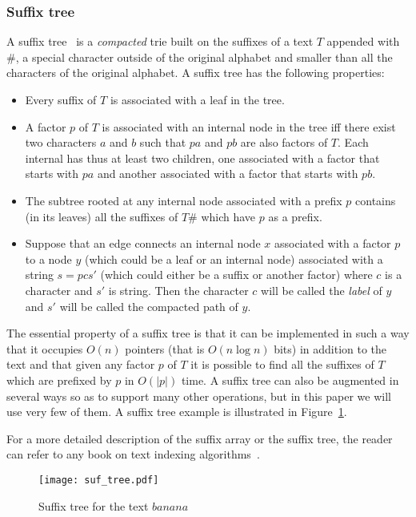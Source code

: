 \documentclass{article}
\newcommand{\?}{\mskip1.5mu}
\begin{document}
\subsubsection{Suffix tree}
A suffix tree~\cite{Wr73,Mc76} is a \emph{compacted} trie built on the suffixes of a text $T$ appended with $\#$, a special character outside of the original alphabet and smaller than all the characters of the original alphabet. 
A suffix tree has the following properties:
\begin{itemize}
\item Every suffix of $T$ is associated with a leaf in the tree.
\item A factor $p$ of $T$ is associated with an internal node in the tree iff there exist two characters $a$ and $b$ such that $pa$ and $pb$ are also factors of $T$. Each internal has thus at least two children, one associated with a factor that starts with $pa$ and another associated with a factor that starts with $pb$. 
\item The subtree rooted at any internal node associated with a prefix $p$ contains (in its leaves) all the suffixes of $T\#$ which have $p$ as a prefix. 
\item Suppose that an edge connects an internal node $x$ associated with a factor $p$ to a node $y$ (which could be a leaf or an internal node) associated with a string $s=pcs'$ (which could either be a suffix or another factor) where $c$ is a character and $s'$ is string. Then the character $c$ will be called the \emph{label} of $y$ and $s'$ will be called the compacted path of $y$. 
\end{itemize}
 The essential property of a suffix tree is that it can be implemented in such a way
that it occupies $O(n)$ pointers (that is $O(n\log n)$ bits) in addition to the text and that given any factor $p$ of $T$ it is possible to find all the suffixes of $T$ which are prefixed by $p$ in $O(|p|)$ time. A suffix tree can also be augmented in several ways so as to support many other operations, but in this paper we will use very few of them. A suffix tree example is illustrated in Figure~\ref{pic:suf_tree}.

For a more detailed description of the suffix array or the suffix tree, the reader can refer to any book on text indexing algorithms~\cite{Gu97,CR03}.
\begin{figure}[htb] 
\centering\texttt{[image: suf\_tree.pdf]} 
\caption{Suffix tree for the text $banana$} \label{pic:suf_tree} \end{figure}
\end{document}
